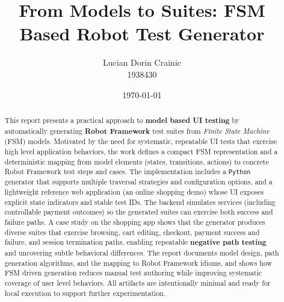 \documentclass[12pt,a4paper,oneside]{article}
\title{From Models to Suites: FSM Based Robot Test Generator}
\author{Lucian Dorin Crainic \\ 1938430}
\date{\today}
\theoremstyle{definition}
\begin{document}

\newpage
\begin{abstract}
\justifying
{}
This report presents a practical approach to \textbf{model based UI testing} by
automatically generating \textbf{Robot Framework} test suites from
\textit{Finite State Machine} (FSM) models. Motivated by the need for
systematic, repeatable UI tests that exercise high level application behaviors,
the work defines a compact FSM representation and a deterministic mapping from
model elements (states, transitions, actions) to concrete Robot Framework
test steps and cases. The implementation includes a \texttt{Python}
generator that supports multiple traversal strategies and configuration
options, and a lightweight reference web application (an online shopping demo)
whose UI exposes explicit state indicators and stable test IDs. The backend
simulates services (including controllable payment outcomes) so the generated
suites can exercise both success and failure paths. A case study on the
shopping app shows that the generator produces diverse suites that exercise
browsing, cart editing, checkout, payment success and failure, and session
termination paths, enabling repeatable \textbf{negative path testing} and
uncovering subtle behavioral differences. The report documents model design,
path generation algorithms, and the mapping to Robot Framework idioms, and
shows how FSM driven generation reduces manual test authoring while improving
systematic coverage of user level behaviors. All artifacts are intentionally
minimal and ready for local execution to support further experimentation.
\end{abstract}

\newpage
\tableofcontents
\newpage


\clearpage

\clearpage

\clearpage

\clearpage

\clearpage

\clearpage



\nocite{*}  
\end{document}
